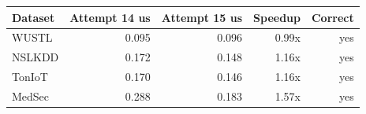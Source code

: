 \begin{tabular}{lrrrr}
\toprule
Dataset & Attempt 14 us & Attempt 15 us & Speedup & Correct \\
\midrule
WUSTL & 0.095 & 0.096 & 0.99x & yes \\
NSLKDD & 0.172 & 0.148 & 1.16x & yes \\
TonIoT & 0.170 & 0.146 & 1.16x & yes \\
MedSec & 0.288 & 0.183 & 1.57x & yes \\
\bottomrule
\end{tabular}
